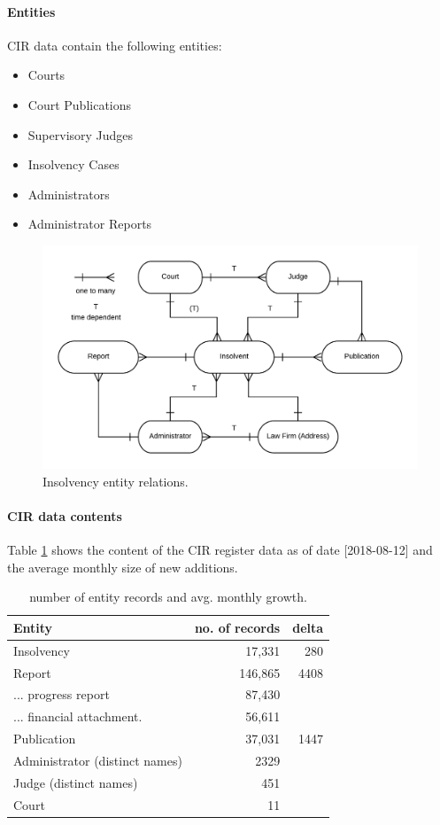 \paragraph{Entities}
CIR data contain the following entities:

\begin{itemize}
	\item Courts
	\item Court Publications
	\item Supervisory Judges 
	\item Insolvency Cases
	\item Administrators
	\item Administrator Reports
\end{itemize}

\begin{figure}[h]
\includegraphics[width=1\linewidth]{images/cir_erd_2.png}
\caption{Insolvency entity relations.}
\end{figure}

\paragraph{CIR data contents}
Table \ref{table:cir_contents} shows the content of the CIR register data as of date [2018-08-12] and the average monthly size of new additions.

\begin{table}[h]
\caption{number of entity records and avg. monthly growth.}
\centering
\begin{tabular}{l r r}
\hline\hline
Entity & no. of records & delta\\
\hline
Insolvency & 17,331 & 280 \\
Report & 146,865 & 4408 \\
... progress report & 87,430 &  \\
... financial attachment. & 56,611 &  \\
Publication & 37,031 & 1447 \\
Administrator (distinct names) & 2329 & \\
Judge (distinct names) & 451 & \\
Court & 11 & \\
\hline
\end{tabular}
\label{table:cir_contents}
\end{table}

